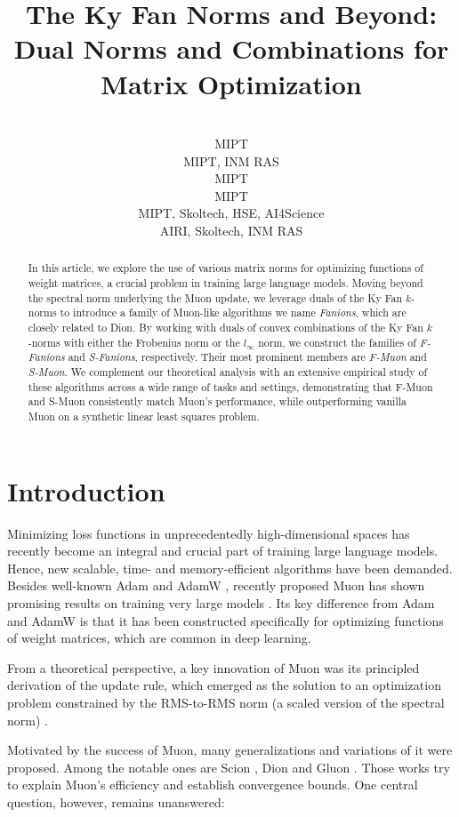 \documentclass[pmlr]{jmlr}%
\title[Ky Fan Norms, Duals, and Norm Combinations for Matrix Optimization]{The Ky Fan Norms and Beyond: Dual Norms and Combinations for Matrix Optimization}
\author{\Name{Alexey Kravatskiy}
        \Email{kravtskii.aiu@phystech.edu}\\
        \addr MIPT
        \AND
        \Name{Ivan Kozyrev}
        \Email{kozyrev.in@phystech.edu}\\
        \addr MIPT, INM RAS
        \AND
        \Name{Nikolai Kozlov}
        \Email{kozlov.na@phystech.edu}\\
        \addr MIPT
        \AND
        \Name{Alexander Vinogradov}
        \Email{vinogradov.am@phystech.edu}\\
        \addr MIPT
        \AND
        \Name{Daniil Merkulov}
        \Email{daniil.merkulov@phystech.edu}\\
        \addr MIPT, Skoltech, HSE, AI4Science
        \AND
        \Name{Ivan Oseledets}
        \Email{i.oseledets@skoltech.ru}\\
        \addr AIRI, Skoltech, INM RAS
 }
\begin{document}
 
 \maketitle
 
 \begin{abstract}
   In this article, we explore the use of various matrix norms for optimizing functions of weight matrices, a crucial problem in training large language models. Moving beyond the spectral norm underlying the Muon update, we leverage duals of the Ky Fan $k$-norms to introduce a family of Muon-like algorithms we name \emph{Fanions}, which are closely related to Dion. By working with duals of convex combinations of the Ky Fan $k$-norms with either the Frobenius norm or the $l_\infty$ norm, we construct the families of \emph{F-Fanions} and \emph{S-Fanions}, respectively. Their most prominent members are \emph{F-Muon} and \emph{S-Muon}. We complement our theoretical analysis with an extensive empirical study of these algorithms across a wide range of tasks and settings, demonstrating that F-Muon and S-Muon consistently match Muon's performance, while outperforming vanilla Muon on a synthetic linear least squares problem.
 \end{abstract}
 
 \section{Introduction}
 
 Minimizing loss functions in unprecedentedly high-dimensional spaces has recently become an integral and crucial part of training large language models. Hence, new scalable, time- and memory-efficient algorithms have been demanded. Besides well-known Adam \citep{kingma2014adam} and AdamW \citep{loshchilov2017decoupled}, recently proposed Muon \citep{jordan2024muon} has shown promising results on training very large models \citep{liu2025muon}. Its key difference from Adam and AdamW is that it has been constructed specifically for optimizing functions of weight matrices, which are common in deep learning.
 
 From a theoretical perspective, a key innovation of Muon was its principled derivation of the update rule, which emerged as the solution to an optimization problem constrained by the RMS-to-RMS norm (a scaled version of the spectral norm) \citep{bernstein2025deriving}.
 
 Motivated by the success of Muon, many generalizations and variations of it were proposed. Among the notable ones are Scion \citep{pethick2025training}, Dion \citep{ahn2025dion} and Gluon \citep{riabinin2025gluon}. Those works try to explain Muon's efficiency and establish convergence bounds. One central question, however, remains unanswered:
 
\end{document}
